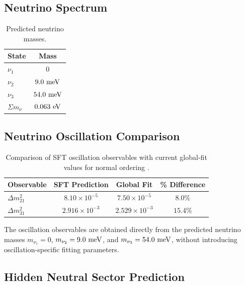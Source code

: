 \documentclass[11pt]{article}
\theoremstyle{definition}
\theoremstyle{remark}
\begin{document}

\subsection{Neutrino Spectrum}

\begin{table}[H]
\centering
\caption{Predicted neutrino masses.}
\begin{tabular}{lc}
\toprule
State & Mass \\
\midrule
$\nu_1$ & $0$ \\
$\nu_2$ & $9.0~{\rm meV}$ \\
$\nu_3$ & $54.0~{\rm meV}$ \\
\midrule
$\Sigma m_\nu$ & $0.063~{\rm eV}$ \\
\bottomrule
\end{tabular}
\end{table}

\subsection{Neutrino Oscillation Comparison}

\begin{table}[H]
\centering
\caption{Comparison of SFT oscillation observables with current global-fit values for normal ordering \cite{NuFIT2024,NuFITWeb}.}
\begin{tabular}{lccc}
\toprule
Observable & SFT Prediction & Global Fit & \% Difference \\
\midrule
$\Delta m_{21}^{2}$ &
$8.10\times10^{-5}$ &
$7.50\times10^{-5}$ &
$8.0\%$ \\

$\Delta m_{31}^{2}$ &
$2.916\times10^{-3}$ &
$2.529\times10^{-3}$ &
$15.4\%$ \\
\bottomrule
\end{tabular}
\end{table}

The oscillation observables are obtained directly from the
predicted neutrino masses
$m_{\nu_1}=0$,
$m_{\nu_2}=9.0~{\rm meV}$,
and
$m_{\nu_3}=54.0~{\rm meV}$,
without introducing oscillation-specific fitting parameters.


\subsection{Hidden Neutral Sector Prediction}
\end{document}
